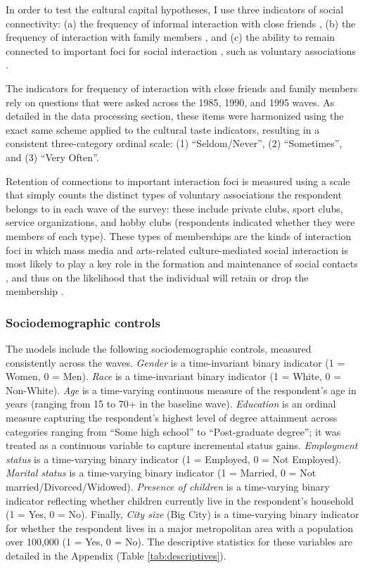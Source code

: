\documentclass[
]{article}
\begin{document}
In order to test the cultural capital hypotheses, I use three indicators of social connectivity: (a) the frequency of informal interaction with close friends \citep{fischer1983}, (b) the frequency of interaction with family members \citep{bott1971, offer2018difficult-67c}, and (c) the ability to remain connected to important foci for social interaction \citep{feld1981}, such as voluntary associations \citep{mcpherson1987}. 

The indicators for frequency of interaction with close friends and family members rely on questions that were asked across the 1985, 1990, and 1995 waves. As detailed in the data processing section, these items were harmonized using the exact same scheme applied to the cultural taste indicators, resulting in a consistent three-category ordinal scale: (1) ``Seldom/Never'', (2) ``Sometimes'', and (3) ``Very Often''.

Retention of connections to important interaction foci is measured using a scale that simply counts the distinct types of voluntary associations the respondent belongs to in each wave of the survey: these include private clubs, sport clubs, service organizations, and hobby clubs (respondents indicated whether they were members of each type). These types of memberships are the kinds of interaction foci in which mass media and arts-related culture-mediated social interaction is most likely to play a key role in the formation and maintenance of social contacts \citep{long2003}, and thus on the likelihood that the individual will retain or drop the membership \citep{mcpherson1992, popielarz1995}.

\subsubsection{Sociodemographic controls}\label{sociodemographic-controls}

The models include the following sociodemographic controls, measured consistently across the waves. \emph{Gender} is a time-invariant binary indicator (1 = Women, 0 = Men). \emph{Race} is a time-invariant binary indicator (1 = White, 0 = Non-White). \emph{Age} is a time-varying continuous measure of the respondent's age in years (ranging from 15 to 70+ in the baseline wave). \emph{Education} is an ordinal measure capturing the respondent's highest level of degree attainment across categories ranging from ``Some high school'' to ``Post-graduate degree''; it was treated as a continuous variable to capture incremental status gains. \emph{Employment status} is a time-varying binary indicator (1 = Employed, 0 = Not Employed). \emph{Marital status} is a time-varying binary indicator (1 = Married, 0 = Not married/Divorced/Widowed). \emph{Presence of children} is a time-varying binary indicator reflecting whether children currently live in the respondent's household (1 = Yes, 0 = No). Finally, \emph{City size} (Big City) is a time-varying binary indicator for whether the respondent lives in a major metropolitan area with a population over 100,000 (1 = Yes, 0 = No). The descriptive statistics for these variables are detailed in the Appendix (Table \ref{tab:descriptives}).
\end{document}
